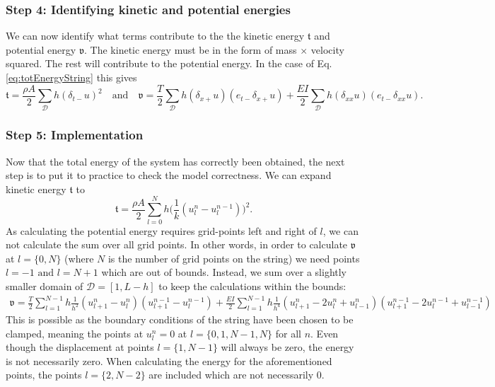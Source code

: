 \documentclass{article}
\begin{document}
\subsubsection*{Step 4: Identifying kinetic and potential energies}
We can now identify what terms contribute to the the kinetic energy $\mathfrak{t}$ and potential energy $\mathfrak{v}$. The kinetic energy must be in the form of mass $\times$ velocity squared. The rest will contribute to the potential energy. %
In the case of Eq. \eqref{eq:totEnergyString} this gives
\begin{equation}
    \mathfrak{t} = \frac{\rho A}{2}\sum_\mathcal{D}h(\delta_{t-}u)^2 \quad \text{and} \quad \mathfrak{v} = \frac{T}{2}\sum_\mathcal{D}h (\delta_{x+}u)( e_{t-}\delta_{x+}u) +\frac{EI}{2}\sum_\mathcal{D}h(\delta_{xx}u)(e_{t-}\delta_{xx}u).
\end{equation}

\subsubsection*{Step 5: Implementation}
Now that the total energy of the system has correctly been obtained, the next step is to put it to practice to check the model correctness. We can expand kinetic energy $\mathfrak{t}$ to
\begin{equation}
    \mathfrak{t} = \frac{\rho A}{2}\sum_{l=0}^Nh\bigg(\frac{1}{k}(u_l^n - u_l^{n-1})\bigg)^2.
\end{equation}
As calculating the potential energy requires grid-points left and right of $l$, we can not calculate the sum over all grid points. In other words, in order to calculate $\mathfrak{v}$ at $l = \{0, N\}$ (where $N$ is the number of grid points on the string) we need points $l = -1 \text{ and } l = N + 1$ which are out of bounds. Instead, we sum over a slightly smaller domain of $\mathcal{D} = [1, L - h]$ to keep the calculations within the bounds:
\begin{equation}
\begin{aligned}
   \mathfrak{v} = \frac{T}{2}\sum_{l = 1}^{N-1} h\frac{1}{h^2}(u_{l+1}^n - u_l^n)(u_{l+1}^{n-1} - u_l^{n-1})
   + \frac{EI}{2}\sum_{l = 1}^{N-1}h\frac{1}{h^4}(u_{l+1}^n-2u_l^n+u_{l-1}^n)(u_{l+1}^{n-1}-2u_l^{n-1}+u_{l-1}^{n-1})
\end{aligned}
\end{equation}
This is possible as the boundary conditions of the string have been chosen to be clamped, meaning the points at $u_l^n = 0$ at $l = \{0, 1, N-1, N\}$ for all $n$. Even though the displacement at points $l = \{1, N-1\}$ will always be zero, the energy is not necessarily zero. When calculating the energy for the aforementioned points, the points $l = \{2, N-2\}$ are included which are not necessarily $0$.
\end{document}
